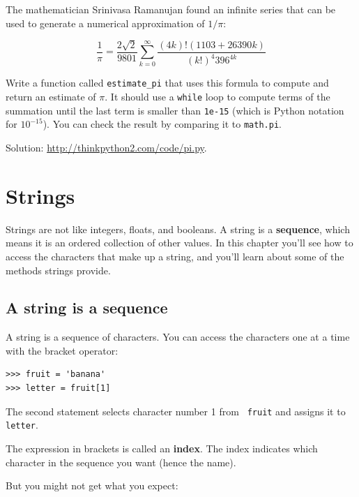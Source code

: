 \documentclass[10pt]{book}
\begin{document}
\begin{exercise}

The mathematician Srinivasa Ramanujan found an
infinite series
that can be used to generate a numerical
approximation of $1 / \pi$:

\[ \frac{1}{\pi} = \frac{2\sqrt{2}}{9801} 
\sum^\infty_{k=0} \frac{(4k)!(1103+26390k)}{(k!)^4 396^{4k}} \]

Write a function called \verb"estimate_pi" that uses this formula
to compute and return an estimate of $\pi$.  It should use a {\tt while}
loop to compute terms of the summation until the last term is
smaller than {\tt 1e-15} (which is Python notation for $10^{-15}$).
You can check the result by comparing it to {\tt math.pi}.

Solution: \url{http://thinkpython2.com/code/pi.py}.

\end{exercise}


\chapter{Strings}
\label{strings}

Strings are not like integers, floats, and booleans.  A string
is a {\bf sequence}, which means it is
an ordered collection of other values.  In this chapter you'll see
how to access the characters that make up a string, and you'll
learn about some of the methods strings provide.


\section{A string is a sequence}

A string is a sequence of characters.  
You can access the characters one at a time with the
bracket operator:

\begin{verbatim}
>>> fruit = 'banana'
>>> letter = fruit[1]
\end{verbatim}
%
The second statement selects character number 1 from {\tt
fruit} and assigns it to {\tt letter}.  

The expression in brackets is called an {\bf index}.  
The index indicates which character in the sequence you
want (hence the name).

But you might not get what you expect:
\end{document}
